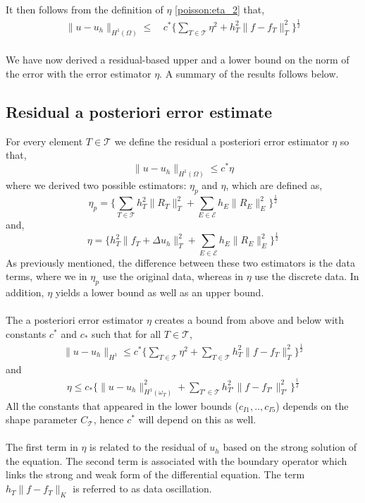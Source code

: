 It then follows from the definition of $\eta$ \eqref{poisson:eta_2} that,
\begin{align} \label{eq:low_bd_edge17}
\| u - u_h \|_{H^1(\Omega)}\leq & \, c^* \bigl\{\sum_{T \in \mathcal{T}} \eta^2 + h_T^2\|f - f_T\|^2_T \bigr\}^{\frac{1}{2}} 
\end{align}
\\
We have now derived a residual-based upper and a lower bound on the norm of the error with the error estimator $\eta$. A summary of the results follows below.
\\
\subsection{Residual a posteriori error estimate}
For every element $T \in \mathcal{T}$ we define the residual a posteriori error estimator $\eta$ so that,
\begin{equation}
\| u - u_h \|_{H^1(\Omega)} \leq c^* \eta
\end{equation}
where we derived two possible estimators: $\eta_p$ and $\eta$, which are defined as, 
\begin{equation}
\eta_p = \bigl\{ \sum_{T \in \mathcal{T}} h_T^2\| R_T\|^2_T + \displaystyle\sum_{E \in \mathcal{E}} h_E\| R_E \|^2_E \bigr\}^{\frac{1}{2}}
\end{equation}
and, 
\begin{equation}
\eta = \bigl\{ h_T^2 \|f_T + \Delta u_h\|_T^2  + \sum_{E \in \mathcal{E}} h_E \|R_E\|_E^2 \bigr\}^{\frac{1}{2}}
\end{equation}
As previously mentioned, the difference between these two estimators is the data terms, where we in $\eta_p$ use the original data, whereas in $\eta$ use the discrete data. In addition, $\eta$ yields a lower bound as well as an upper bound.
\\
\\
The a posteriori error estimator $\eta$ creates a bound from above and below with constants $c^*$ and $c_*$ such that for all $T \in \mathcal{T}$,
\begin{align} \label{eq:poisson_a_posteriori2}
\|u - u_h\|_{H^1} \leq c^*\bigl\{ \displaystyle\sum_{T \in \mathcal{T}} \eta^2 + \displaystyle\sum_{T \in \mathcal{T}} h_T^2 \|f-f_T\|_T^2 \bigr\}^{\frac{1}{2}}
\end{align}
and
\begin{align}
\eta \leq c_* \bigl\{ \|u-u_h \|^2_{H^1(\omega_T)} + \displaystyle\sum_{T' \in \mathcal{T}} h_{T'}^2 \|f-f_{T'}\|_{T'}^2 \bigr\}^{\frac{1}{2}}
\end{align}
All the constants that appeared in the lower bounds ($c_{I1}, .., c_{I5}$) depends on the shape parameter $C_\mathcal{T}$, hence $c^*$ will depend on this as well. 
\\
\\
The first term in $\eta$ is related to the residual of $u_h$ based on the strong solution of the equation. The second term is associated with the boundary operator which links the strong and weak form of the differential equation. The term $h_T \|f-f_T\|_K$ is referred to as data oscillation. 



